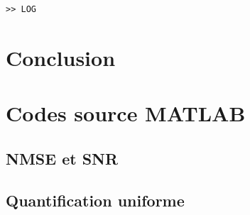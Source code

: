 \documentclass[a4paper, 12pt]{article}
\newcommand{\FSource}[1]{%

}
\begin{document}
\begin{verbatim}
>> LOG
\end{verbatim} 

\newpage

\section{Conclusion}


\clearpage
\appendix

\section{Codes source MATLAB}
\subsection{NMSE et SNR}\label{nmse_snr_code}

\FSource{../disto_1_1.m}

\newpage

\subsection{Quantification uniforme}\label{quant_uni_code}

\FSource{../quant_uni_1_2.m}
\end{document}
